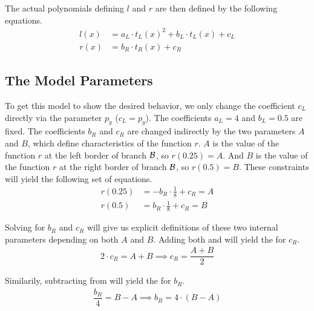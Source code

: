 The actual polynomials defining $l$ and $r$ are then defined by the following equations.
\begin{align}
    l(x) & = a_L \cdot t_L(x)^2 + b_L \cdot t_L(x) + c_L \\
    r(x) & = b_R \cdot t_R(x) + c_R
    \label{equ:final.def.r}
\end{align}

\subsection{The Model Parameters}

To get this model to show the desired behavior, we only change the coefficient $c_L$ directly via the parameter $p_y$ ($c_L = p_y$).
The coefficients $a_L = 4$ and $b_L = 0.5$ are fixed.
The coefficients $b_R$ and $c_R$ are changed indirectly by the two parameters $A$ and $B$, which define characteristics of the function $r$.
$A$ is the value of the function $r$ at the left border of branch $\mathcal{B}$, so $r(0.25) = A$.
And $B$ is the value of the function $r$ at the right border of branch $\mathcal{B}$, so $r(0.5) = B$.
These constraints will yield the following set of equations.
\begin{subequations}
    \begin{align}
        r(0.25) & = - b_R \cdot \frac{1}{8} + c_R = A
        \label{equ:final.def.param.constr.A}
        \\
        r(0.5)  & = b_R \cdot \frac{1}{8} + c_R = B
        \label{equ:final.def.param.constr.B}
    \end{align}
\end{subequations}

Solving for $b_R$ and $c_R$ will give us explicit definitions of these two internal parameters depending on both $A$ and $B$.
Adding both  and  will yield the  for $c_R$.
\begin{align}
    2 \cdot c_R = A + B \implies c_R = \dfrac{A + B}{2}
    \label{equ:final.def.param.cR}
\end{align}

Similarily, subtracting  from  will yield the  for $b_R$.
\begin{align}
    \dfrac{b_R}{4} = B - A \implies b_R = 4 \cdot (B - A)
    \label{equ:final.def.param.bR}
\end{align}

